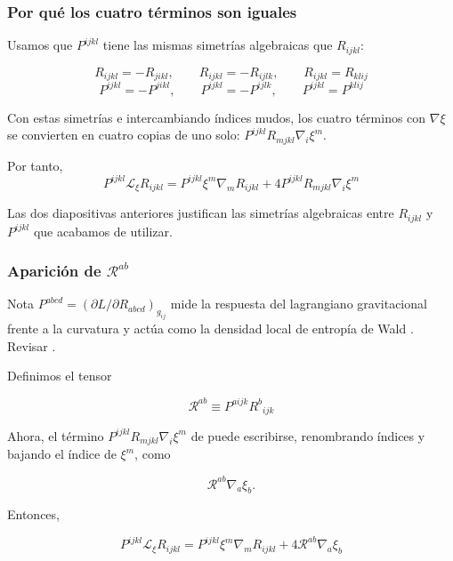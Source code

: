 \documentclass{beamer}
\begin{document}
\begin{frame}[label=nav-frame-013]
\frametitle{Por qué los cuatro términos son iguales}
\small

Usamos que $P^{ijkl}$ tiene las mismas simetrías algebraicas que $R_{ijkl}$:

\[
R_{ijkl}=-R_{jikl},
\qquad
R_{ijkl}=-R_{ijlk},
\qquad
R_{ijkl}=R_{klij}
\]\[P^{ijkl}=-P^{jikl},
\qquad
P^{ijkl}=-P^{ijlk},
\qquad
P^{ijkl}=P^{klij}
\]


Con estas simetrías e intercambiando índices mudos, los cuatro términos con $\nabla\xi$ se convierten en cuatro copias de uno solo: $P^{ijkl}R_{mjkl}\nabla_i\xi^m$. \newline

Por tanto, \[\boxed{P^{ijkl}\mathcal L_\xi R_{ijkl} = P^{ijkl}\xi^m\nabla_mR_{ijkl}+4P^{ijkl}R_{mjkl}\nabla_i\xi^m}\]

Las dos diapositivas anteriores justifican las simetrías algebraicas entre $R_{ijkl}$ y $P^{ijkl}$ que acabamos de utilizar.

\end{frame}

\begin{frame}[label=nav-frame-014]
\frametitle{Aparición de $\mathcal R^{ab}$}
\small

\begin{block}{Nota}
\(P^{abcd}=\left(\partial L/\partial R_{abcd}\right)_{g_{ij}}\) mide la respuesta del lagrangiano gravitacional frente a la curvatura y actúa como la densidad local de entropía de Wald . Revisar \cite{Padmanabhan2010}.
\end{block}

Definimos el tensor

\begin{equation}
\boxed{\mathcal R^{ab} \equiv P^{aijk}R^b{}_{ijk}}
\label{eq:def-Rcal}
\end{equation}

Ahora, el término $P^{ijkl}R_{mjkl}\nabla_i\xi^m$ de puede escribirse, renombrando índices y bajando el índice de $\xi^m$, como

\[
\mathcal R^{ab}\nabla_a\xi_b.
\]

Entonces,

\begin{equation}\boxed{
P^{ijkl}\mathcal L_\xi R_{ijkl} =
P^{ijkl}\xi^m\nabla_mR_{ijkl}+4\mathcal R^{ab}\nabla_a\xi_b}
\label{eq:contraccion-P-lie-riemann}
\end{equation}

\end{frame}
\end{document}
